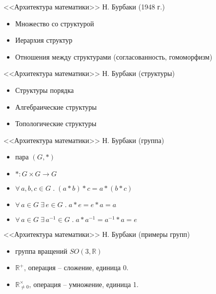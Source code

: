 \documentclass{beamer}
\begin{document}
\begin{frame}{<<Архитектура математики>> Н. Бурбаки (1948 г.)}
    \begin{itemize}
        \item Множество со структурой
        \item Иерархия структур
        \item Отношения между структурами (согласованность, гомоморфизм)
    \end{itemize}
\end{frame}

\begin{frame}{<<Архитектура математики>> Н. Бурбаки (структуры)}
    \begin{itemize}
        \item Структуры порядка
        \item Алгебраические структуры
        \item Топологические структуры
    \end{itemize}
\end{frame}

\begin{frame}{<<Архитектура математики>> Н. Бурбаки (группа)}
    \begin{itemize}
        \item пара $(G, \ast)$
        \item $\ast : G \times G \to G$ 
        \item $\forall \, a, b, c \in G \; . \; (a \ast b) \ast c = a \ast (b \ast c)$
        \item $\forall \, a \in G \; \exists \, e \in G \; . \; a \ast e = e \ast a = a$
        \item $\forall \, a \in G \; \exists \, a^{-1} \in G \; . \; a \ast a^{-1} = a^{-1} \ast a = e$
    \end{itemize}
\end{frame}

\begin{frame}{<<Архитектура математики>> Н. Бурбаки (примеры групп)}
    \begin{itemize}
        \item группа вращений $SO(3, \mathbb{R})$ 
        \item $\mathbb{R}^+$, операция -- сложение, единица 0. 
        \item $\mathbb{R}_{\neq 0}^\times$, операция -- умножение, единица 1.
    \end{itemize}
\end{frame}
\end{document}
